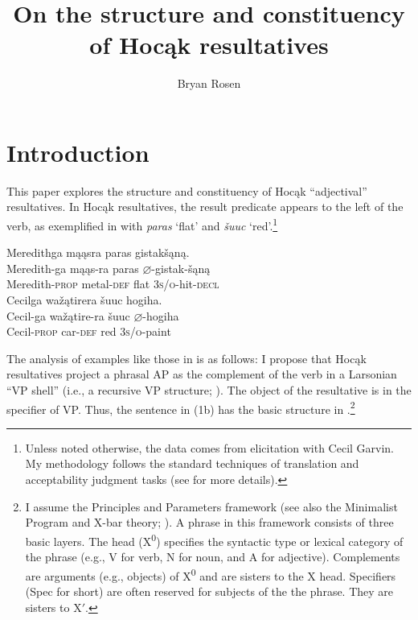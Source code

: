 \documentclass[output=paper]{LSP/langsci}
\author{Bryan Rosen}
\title{On the structure and constituency of Hocąk resultatives}
\begin{document}
\section{Introduction}

This paper explores the structure and constituency of Hocąk ``adjectival'' resultatives. In Hocąk resultatives, the result predicate appears to the left of the verb, as exemplified in  with \textit{paras} `flat' and \textit{šuuc} `red'.\footnote{Unless noted otherwise, the data comes from  elicitation with Cecil Garvin. My methodology follows the standard techniques of translation and acceptability judgment tasks (see \citealt{Matthewson2004} for more details).}

\ea
\ea
\glll Meredithga mąąsra paras gistakšąną. \\
 Meredith-ga mąąs-ra paras {$\varnothing$}-gistak-šąną\\
Meredith-\textsc{prop} metal-\textsc{def} flat  \textsc{3s/o}-hit-\textsc{decl}\\

\ex 
\glll Cecilga wažątirera šuuc hogiha. \\
Cecil-ga  wažątire-ra šuuc {$\varnothing$}-hogiha \\
Cecil-\textsc{prop} car-\textsc{def} red \textsc{3s/o}-paint\\
\z
\z


The analysis of examples like those in  is as follows: I propose that Hocąk resultatives project a phrasal AP as the complement of the verb in a Larsonian ``VP shell'' (i.e., a recursive VP structure; \citealt{Larson1988}). The object of the resultative is in the specifier of VP. Thus, the sentence in (1b) has the basic structure in .\footnote{I assume the Principles and Parameters framework (see also the Minimalist Program and X-bar theory; \citealt{Chomsky1995}). A phrase in this framework consists of three basic layers. The head (X\textsuperscript{0}) specifies the syntactic type or lexical category of the phrase (e.g., V for verb, N for noun, and A for adjective). Complements are arguments (e.g., objects) of X\textsuperscript{0} and are sisters to the X head. Specifiers (Spec for short) are often reserved for subjects of the the phrase. They are sisters to X$'$.}
\begin{exe}
\ex

{\hspace{1em}}\newline
{}
\end{exe}
\end{document}
